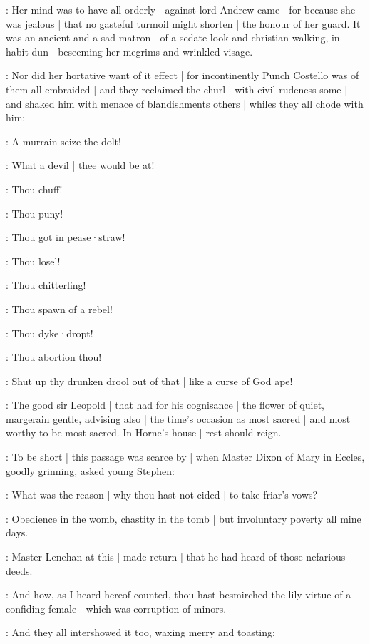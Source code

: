 :
Her mind was to have all orderly |
against lord Andrew came |
for because she was jealous |
that no gasteful turmoil might shorten |
the honour of her guard.
It was an ancient and a sad matron |
of a sedate look and christian walking,
in habit dun |
beseeming her megrims and wrinkled visage.

:
Nor did her hortative want of it effect |
for incontinently Punch Costello was of them all embraided |
and they reclaimed the churl |
with civil rudeness some |
and shaked him with menace of blandishments others |
whiles they all chode with him:

\lynch:
A murrain seize the dolt!

\madden:
What a devil |
thee would be at!

\crotthers:
Thou chuff!

\dixon:
Thou puny!

\lenehan:
Thou got in pease·straw!

\lynch:
Thou losel!

\madden:
Thou chitterling!

\crotthers:
Thou spawn of a rebel!

\lenehan:
Thou dyke·dropt!

\dixon:
Thou abortion thou!

\stephen:
Shut up thy drunken drool out of that |
like a curse of God ape!%

:
The good sir Leopold |
that had for his cognisance |
the flower of quiet,
margerain gentle,
advising also |
the time's occasion as most sacred |
and most worthy to be most sacred.
In Horne's house |
rest should reign.



:
To be short |
this passage was scarce by |
when Master Dixon of Mary in Eccles,
goodly grinning,
asked young Stephen:

\dixon:
What was the reason |
why thou hast not cided |
to take friar's vows?

\stephen:
Obedience in the womb,
chastity in the tomb |
but involuntary poverty all mine days.

:
Master Lenehan at this |
made return |
that he had heard of those nefarious deeds.

\lenehan:
And how,
as I heard hereof counted,
thou hast besmirched the lily virtue of a confiding female |
which was corruption of minors.

:
And they all intershowed it too,
waxing merry and toasting:

